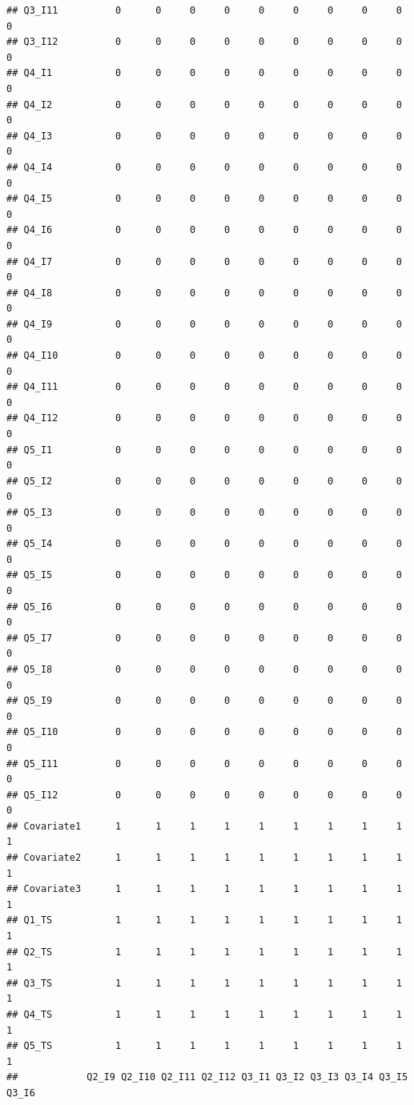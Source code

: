 \documentclass[]{book}
\begin{document}
\begin{verbatim}
## Q3_I11          0      0     0     0     0     0     0     0     0     0
## Q3_I12          0      0     0     0     0     0     0     0     0     0
## Q4_I1           0      0     0     0     0     0     0     0     0     0
## Q4_I2           0      0     0     0     0     0     0     0     0     0
## Q4_I3           0      0     0     0     0     0     0     0     0     0
## Q4_I4           0      0     0     0     0     0     0     0     0     0
## Q4_I5           0      0     0     0     0     0     0     0     0     0
## Q4_I6           0      0     0     0     0     0     0     0     0     0
## Q4_I7           0      0     0     0     0     0     0     0     0     0
## Q4_I8           0      0     0     0     0     0     0     0     0     0
## Q4_I9           0      0     0     0     0     0     0     0     0     0
## Q4_I10          0      0     0     0     0     0     0     0     0     0
## Q4_I11          0      0     0     0     0     0     0     0     0     0
## Q4_I12          0      0     0     0     0     0     0     0     0     0
## Q5_I1           0      0     0     0     0     0     0     0     0     0
## Q5_I2           0      0     0     0     0     0     0     0     0     0
## Q5_I3           0      0     0     0     0     0     0     0     0     0
## Q5_I4           0      0     0     0     0     0     0     0     0     0
## Q5_I5           0      0     0     0     0     0     0     0     0     0
## Q5_I6           0      0     0     0     0     0     0     0     0     0
## Q5_I7           0      0     0     0     0     0     0     0     0     0
## Q5_I8           0      0     0     0     0     0     0     0     0     0
## Q5_I9           0      0     0     0     0     0     0     0     0     0
## Q5_I10          0      0     0     0     0     0     0     0     0     0
## Q5_I11          0      0     0     0     0     0     0     0     0     0
## Q5_I12          0      0     0     0     0     0     0     0     0     0
## Covariate1      1      1     1     1     1     1     1     1     1     1
## Covariate2      1      1     1     1     1     1     1     1     1     1
## Covariate3      1      1     1     1     1     1     1     1     1     1
## Q1_TS           1      1     1     1     1     1     1     1     1     1
## Q2_TS           1      1     1     1     1     1     1     1     1     1
## Q3_TS           1      1     1     1     1     1     1     1     1     1
## Q4_TS           1      1     1     1     1     1     1     1     1     1
## Q5_TS           1      1     1     1     1     1     1     1     1     1
##            Q2_I9 Q2_I10 Q2_I11 Q2_I12 Q3_I1 Q3_I2 Q3_I3 Q3_I4 Q3_I5 Q3_I6

\end{verbatim}
\end{document}
